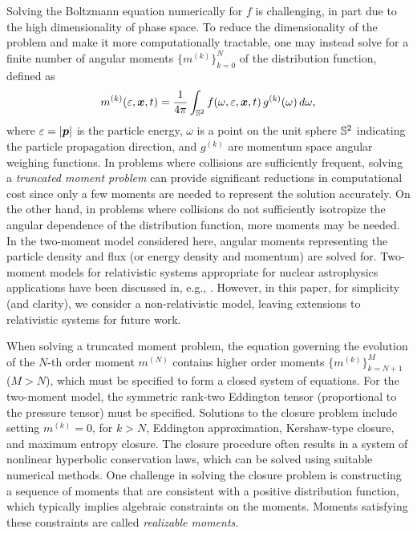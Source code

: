 Solving the Boltzmann equation numerically for $f$ is challenging, in part due to the high dimensionality of phase space.  
To reduce the dimensionality of the problem and make it more computationally tractable, one may instead solve for a finite number of angular moments $\{m^{(k)}\}_{k=0}^{N}$ of the distribution function, defined as
\begin{equation}
  m^{(k)}(\varepsilon,\boldsymbol{x},t)=\frac{1}{4\pi}\int_{\mathbb{S}^{2}}f(\omega,\varepsilon,\boldsymbol{x},t)\,g^{(k)}(\omega)\,d\omega,
\end{equation}
where $\varepsilon=|\boldsymbol{p}|$ is the particle energy, $\omega$ is a point on the unit sphere $\mathbb{S}^{2}$ indicating the particle propagation direction, and $g^{(k)}$ are momentum space angular weighing functions.  
In problems where collisions are sufficiently frequent, solving a \emph{truncated moment problem} can provide significant reductions in computational cost since only a few moments are needed to represent the solution accurately.  
On the other hand, in problems where collisions do not sufficiently isotropize the angular dependence of the distribution function, more moments may be needed.  
In the two-moment model considered here, angular moments representing the particle density and flux (or energy density and momentum) are solved for.  
Two-moment models for relativistic systems appropriate for nuclear astrophysics applications have been discussed in, e.g., \cite{lindquist_1966,andersonSpiegel_1972,thorne_1981,shibata_etal_2011,cardall_etal_2013a}.  
However, in this paper, for simplicity (and clarity), we consider a non-relativistic model, leaving extensions to relativistic systems for future work.  

When solving a truncated moment problem, the equation governing the evolution of the $N$-th order moment $m^{(N)}$ contains higher order moments $\{m^{(k)}\}_{k=N+1}^{M}$ ($M>N$), which must be specified to form a closed system of equations.  
For the two-moment model, the symmetric rank-two Eddington tensor (proportional to the pressure tensor) must be specified.  
Solutions to the closure problem include setting $m^{(k)}=0$, for $k>N$, Eddington approximation, Kershaw-type closure, and maximum entropy closure.  
The closure procedure often results in a system of nonlinear hyperbolic conservation laws, which can be solved using suitable numerical methods.  
One challenge in solving the closure problem is constructing a sequence of moments that are consistent with a positive distribution function, which typically implies algebraic constraints on the moments.  
Moments satisfying these constraints are called \emph{realizable moments}.  

